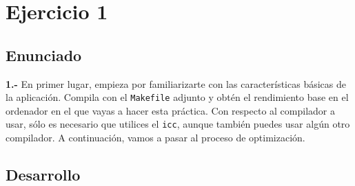 \section{Ejercicio 1}
\subsection{Enunciado}
\begin{ejer}
    \textbf{1.-} En primer lugar, empieza por familiarizarte con las características básicas de la aplicación. 
    Compila con el \texttt{Makefile} adjunto y obtén el rendimiento base en el ordenador en el que vayas a hacer esta
    práctica. Con respecto al compilador a usar, sólo es necesario que utilices el \texttt{icc}, aunque también
    puedes usar algún otro compilador. A continuación, vamos a pasar al proceso de optimización. 
\end{ejer}
\subsection{Desarrollo}